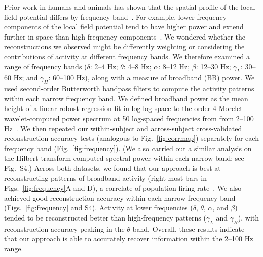\documentclass[11pt]{article}
\newcommand{\freqpower}{S4}
\begin{document}
Prior work in humans and animals has shown that the spatial profile of the local
field potential differs by frequency band~\citep[e.g., with respect to volume
conductance properties and contribution to the local field
potential;][]{BuzsEtal12, FrieEtal07, CronEtal11}.  For example, lower frequency
components of the local field potential tend to have higher power and extend
further in space than high-frequency components~\citep[e.g., ][]{MillEtal07,
MannEtal09}.  We wondered whether the reconstructions we observed might be
differently weighting or considering the contributions of activity at different
frequency bands.  We therefore examined a range of frequency bands ($\delta$:
2--4 Hz; $\theta$: 4--8 Hz; $\alpha$: 8--12 Hz; $\beta$: 12--30 Hz; $\gamma_L$:
30--60 Hz; and $\gamma_H$: 60--100 Hz), along with a measure of broadband (BB)
power. We used second-order Butterworth bandpass filters to compute the activity
patterns within each narrow frequency band.  We defined broadband power as the
mean height of a linear robust regression fit in log-log space to the order 4
Morelet wavelet-computed power spectrum at 50 log-spaced frequencies from from
2--100 Hz~\citep{MannEtal09}. We then repeated our within-subject and
across-subject cross-validated reconstruction accuracy tests (analogous to
Fig.~\ref{fig:corrmap}) separately for each frequency band
(Fig.~\ref{fig:frequency}). (We also carried out a similar analysis on the
Hilbert transform-computed spectral power within each narrow band; see
Fig.~\freqpower.) Across both datasets, we found that our approach is best at
reconstructing patterns of broadband activity (right-most bars in
Figs.~\ref{fig:frequency}A and D), a correlate of population firing
rate~\citep{MannEtal09}.  We also achieved good reconstruction accuracy within
each narrow frequency band (Figs.~\ref{fig:frequency} and \freqpower).  Activity
at lower frequencies ($\delta$, $\theta$, $\alpha$, and $\beta$) tended to be
reconstructed better than high-frequency patterns ($\gamma_L$ and $\gamma_H$),
with reconstruction accuracy peaking in the $\theta$ band.  Overall, these
results indicate that our approach is able to accurately recover information
within the 2--100 Hz range.
\end{document}

